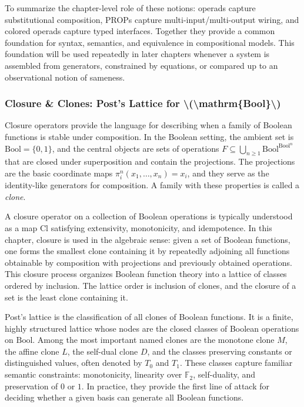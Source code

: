 \documentclass[11pt]{article}
\begin{document}
To summarize the chapter-level role of these notions: operads capture substitutional composition, PROPs capture multi-input/multi-output wiring, and colored operads capture typed interfaces. Together they provide a common foundation for syntax, semantics, and equivalence in compositional models. This foundation will be used repeatedly in later chapters whenever a system is assembled from generators, constrained by equations, or compared up to an observational notion of sameness.


\subsubsection{Closure \& Clones: Post’s Lattice for \textbackslash{}(\textbackslash{}mathrm\{Bool\}\textbackslash{})}

Closure operators provide the language for describing when a family of Boolean functions is stable under composition. In the Boolean setting, the ambient set is \(\mathrm{Bool}=\{0,1\}\), and the central objects are sets of operations \(F\subseteq \bigcup_{n\ge 1}\mathrm{Bool}^{\mathrm{Bool}^n}\) that are closed under superposition and contain the projections. The projections are the basic coordinate maps \(\pi_i^n(x_1,\dots,x_n)=x_i\), and they serve as the identity-like generators for composition. A family with these properties is called a \emph{clone}.

A closure operator on a collection of Boolean operations is typically understood as a map \(\mathrm{Cl}\) satisfying extensivity, monotonicity, and idempotence. In this chapter, closure is used in the algebraic sense: given a set of Boolean functions, one forms the smallest clone containing it by repeatedly adjoining all functions obtainable by composition with projections and previously obtained operations. This closure process organizes Boolean function theory into a lattice of classes ordered by inclusion. The lattice order is inclusion of clones, and the closure of a set is the least clone containing it.

Post's lattice is the classification of all clones of Boolean functions. It is a finite, highly structured lattice whose nodes are the closed classes of Boolean operations on \(\mathrm{Bool}\). Among the most important named clones are the monotone clone \(M\), the affine clone \(L\), the self-dual clone \(D\), and the classes preserving constants or distinguished values, often denoted by \(T_0\) and \(T_1\). These classes capture familiar semantic constraints: monotonicity, linearity over \(\mathbb{F}_2\), self-duality, and preservation of \(0\) or \(1\). In practice, they provide the first line of attack for deciding whether a given basis can generate all Boolean functions.
\end{document}
